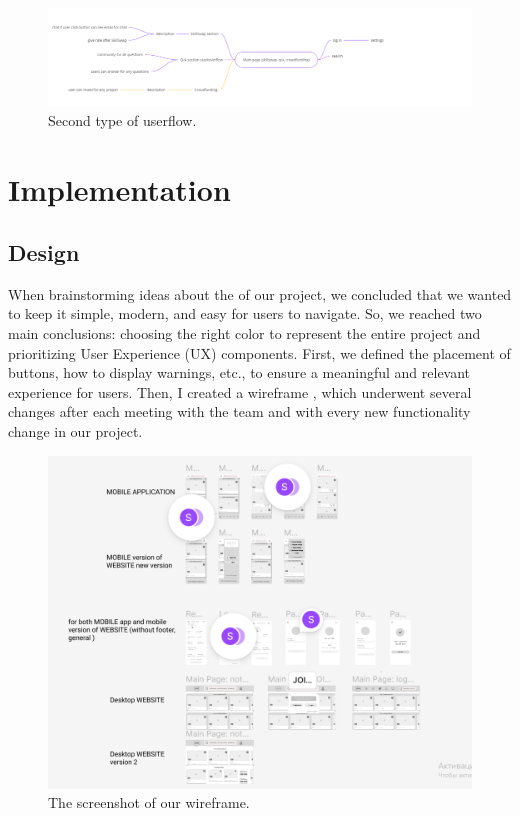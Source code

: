 \begin{figure}[ht]\label{fig:userflow2}
  \centering
  \includegraphics[width=0.8\linewidth]{figures/Userflow -2.png}
  \caption{Second type of userflow.}
\end{figure}

\newpage
\section{Implementation}\label{impl}
\subsection{Design}\label{des}
When brainstorming ideas about the  of our project, we concluded that we wanted to keep it simple, modern, and easy for users to navigate. So, we reached two main conclusions: choosing the right color to represent the entire project and prioritizing User Experience (UX) \cite{design} components. First, we defined the placement of buttons, how to display warnings, etc., to ensure a meaningful and relevant experience for users. Then, I created a wireframe \cite{wireframe}, which underwent several changes after each meeting with the team and with every new functionality change in our project.

\begin{figure}[ht]\label{fig:wireframe}
  \centering
  \includegraphics[width=0.8\linewidth]{figures/wireframe.png}
  \caption{The screenshot of our wireframe.}
\end{figure}

